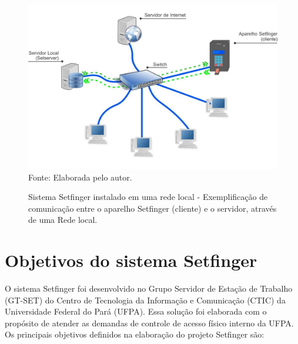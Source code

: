 \begin{figure}[!ht]
  \begin{center}
  \caption{Sistema Setfinger instalado em uma rede local - Exemplificação de comunicação entre o aparelho Setfinger (cliente) e o servidor, através de uma Rede local.}
  \includegraphics[scale=0.6]{figuras/cap4/rede_setfinger.jpg}\\
  Fonte: Elaborada pelo autor.
  \label{rede_setfinger}
  \end{center}
  \end{figure}

\section{Objetivos do sistema Setfinger\label{objetivos_sf}}

O sistema Setfinger foi desenvolvido no Grupo Servidor de Estação de Trabalho (GT-SET) do Centro de Tecnologia da Informação e Comunicação (CTIC) da Universidade Federal do Pará (UFPA). Essa solução foi elaborada com o propósito de atender as demandas de controle de acesso físico interno da UFPA. Os principais objetivos definidos na elaboração do projeto Setfinger são:




